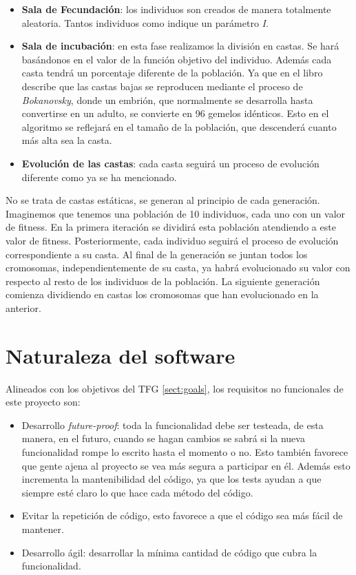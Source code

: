 \begin{itemize}
    \item \textbf{Sala de Fecundación}: los individuos son creados de manera totalmente aleatoria. Tantos individuos
    como indique un parámetro \textit{I}.
    \item \textbf{Sala de incubación}: en esta fase realizamos la división en castas. Se hará basándonos en el valor de
    la función objetivo del individuo. Además cada casta tendrá un porcentaje diferente de la población. Ya que en el libro
    describe que las castas bajas se reproducen mediante el proceso de \textit{Bokanovsky}, donde un embrión, que normalmente 
    se desarrolla hasta convertirse en un adulto, se convierte en 96 gemelos idénticos. Esto en el algoritmo se reflejará 
    en el tamaño de la población, que descenderá cuanto más alta sea la casta.    
    \item \textbf{Evolución de las castas}: cada casta seguirá un proceso de evolución diferente como ya se 
    ha mencionado.
\end{itemize}

No se trata de castas estáticas, se generan al principio de cada generación. Imaginemos que tenemos una población de 10 individuos, cada 
uno con un valor de fitness. En la primera iteración se dividirá esta población atendiendo a este valor de fitness. Posteriormente,
cada individuo seguirá el proceso de evolución correspondiente a su casta. Al final de la generación se juntan todos los cromosomas,
independientemente de su casta, ya habrá evolucionado su valor con respecto al resto de los individuos de la
población. La siguiente generación comienza dividiendo en castas los cromosomas que han evolucionado en la anterior.

\section{Naturaleza del software} \label{sect:no-funcionales}

Alineados con los objetivos del TFG \ref{sect:goals}, los requisitos no funcionales de este proyecto son:

\begin{itemize}
    \item Desarrollo \emph{future-proof}: toda la funcionalidad debe ser testeada, de esta manera, en el futuro,
    cuando se hagan cambios se sabrá si la nueva funcionalidad rompe lo escrito hasta el momento o no. Esto
    también favorece que gente ajena al proyecto se vea más segura a participar en él. Además esto incrementa
    la mantenibilidad del código, ya que los tests ayudan a que siempre esté claro lo que hace cada método
    del código.
    \item Evitar la repetición de código, esto favorece a que el código sea más fácil de mantener.
    \item Desarrollo ágil: desarrollar la mínima cantidad de código que cubra la funcionalidad.
\end{itemize}

